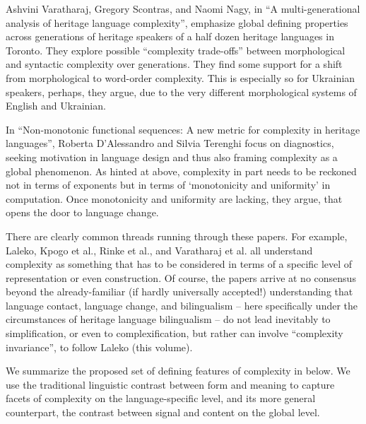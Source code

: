 \documentclass[output=paper,colorlinks,citecolor=brown]{langscibook}
\begin{document}
Ashvini Varatharaj, Gregory Scontras, and Naomi Nagy, in “A multi-gen\-er\-a\-tion\-al analysis of heritage language complexity”, emphasize global defining properties across generations of heritage speakers of a half dozen heritage languages in Toronto. They explore possible “complexity trade-offs” between morphological and syntactic complexity over generations. They find some support for a shift from morphological to word-order complexity. This is especially so for Ukrainian speakers, perhaps, they argue, due to the very different morphological systems of English and Ukrainian.

In “Non-monotonic functional sequences: A new metric for complexity in heritage languages”, Roberta D'Alessandro and Silvia Terenghi focus on diagnostics, seeking motivation in language design and thus also framing complexity as a global phenomenon. As hinted at above, complexity in part needs to be reckoned not in terms of exponents but in terms of ‘monotonicity and uniformity’ in computation. Once monotonicity and uniformity are lacking, they argue, that opens the door to language change.

There are clearly common threads running through these papers. For example, Laleko, Kpogo et al., Rinke et al., and Varatharaj et al. all understand complexity as something that has to be considered in terms of a specific level of representation or even construction. Of course, the papers arrive at no consensus beyond the already-familiar (if hardly universally accepted!) understanding that language contact, language change, and bilingualism  --  here specifically under the circumstances of heritage language bilingualism  --  do not lead inevitably to simplification, or even to complexification, but rather can involve “complexity invariance”, to follow Laleko (this volume).

We summarize the proposed set of defining features of complexity in  below. We use the traditional linguistic contrast between form and meaning to capture facets of complexity on the language-specific level, and its more general counterpart, the contrast between signal and content on the global level.
\end{document}
